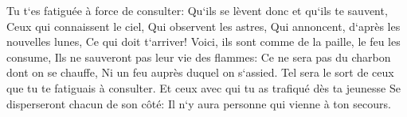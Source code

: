 \verse Tu t`es fatiguée à force de consulter: Qu`ils se lèvent donc et qu`ils te sauvent, Ceux qui connaissent le ciel, Qui observent les astres, Qui annoncent, d`après les nouvelles lunes, Ce qui doit t`arriver! 
\verse Voici, ils sont comme de la paille, le feu les consume, Ils ne sauveront pas leur vie des flammes: Ce ne sera pas du charbon dont on se chauffe, Ni un feu auprès duquel on s`assied. 
\verse Tel sera le sort de ceux que tu te fatiguais à consulter. Et ceux avec qui tu as trafiqué dès ta jeunesse Se disperseront chacun de son côté: Il n`y aura personne qui vienne à ton secours. 

\chapter{}

